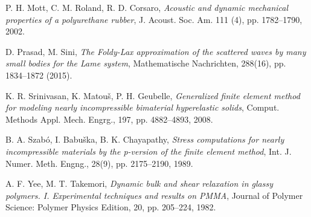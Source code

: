\documentclass[a4paper,11pt]{article}
\theoremstyle{remark}
\theoremstyle{definition}
\numberwithin{equation}{section}
\begin{document}
\begin{thebibliography}{99}
 {P. H. Mott, C. M. Roland, R. D. Corsaro}, {\it Acoustic and dynamic mechanical properties of a polyurethane rubber}, J. Acoust. Soc. Am. 111 (4), pp. 1782--1790, 2002.

 {D. Prasad, M. Sini}, {\it The Foldy-Lax approximation of the scattered waves by many small bodies for the Lame system}, Mathematische Nachrichten, 288(16), pp. 1834--1872 (2015).


 {K. R. Srinivasan, K. Matou\v{s}, P. H. Geubelle}, {\it Generalized finite element method for modeling nearly
incompressible bimaterial hyperelastic solids}, Comput. Methods Appl. Mech. Engrg., 197, pp. 4882--4893, 2008.

 {B. A. Szab\'{o}, I. Babu\v{s}ka, B. K. Chayapathy}, {\it Stress computations for nearly incompressible materials by the p-version of the finite element method}, Int. J. Numer. Meth. Engng., 28(9), pp. 2175--2190, 1989.

  {A. F. Yee, M. T. Takemori}, {\it Dynamic bulk and shear relaxation in glassy polymers. I. Experimental techniques and results on PMMA}, Journal of Polymer Science: Polymer Physics Edition, 20, pp. 205--224, 1982.



\end{thebibliography}
\end{document}
